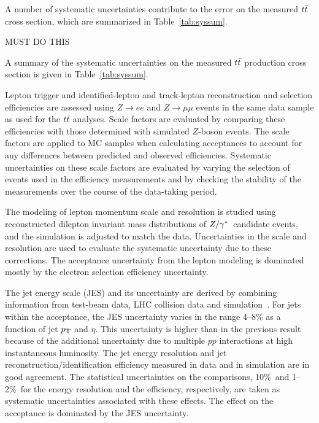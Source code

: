 A number of systematic uncertainties contribute to the error on the measured $t\bar{t}$ cross section, which are summarized in Table~\ref{tab:syssum}.

MUST DO THIS


A summary of the systematic uncertainties on the measured $t\bar{t}$ production cross section is given in Table~\ref{tab:syssum}.

Lepton trigger and identified-lepton and track-lepton
reconstruction and selection efficiencies are assessed using
$Z\rightarrow ee$ and $Z\rightarrow\mu\mu$ events in the same data
sample as used for the $t\bar{t}$ analyses.
Scale factors are evaluated by comparing these efficiencies with those determined with simulated $Z$-boson events. The scale factors are applied to MC samples when calculating
acceptances to account for any differences between predicted and observed efficiencies.  Systematic uncertainties on these scale factors are evaluated by varying the selection of events used in the efficiency measurements and by checking the stability of the measurements over the course of the data-taking period.

The modeling of lepton momentum scale and resolution is studied using
reconstructed dilepton invariant mass distributions of $Z/\gamma^{*}$\ candidate events, and
the simulation is adjusted to match the data.  Uncertainties in the scale and resolution are used to
evaluate the systematic uncertainty due to these corrections.
The acceptance uncertainty from the lepton modeling is dominated
mostly by the electron selection efficiency uncertainty.

The jet energy scale (JES) and its uncertainty are derived by
combining information from test-beam data, LHC collision data and
simulation~\cite{Aad:2011he}.
For jets within the acceptance, the JES uncertainty varies
in the range 4--8\%
as a function of jet $p_{\mathrm{T}}$ and $\eta$. This uncertainty is higher than in the previous result~\cite{ATL-CONF-2011-034} because of the additional uncertainty due to multiple $pp$ interactions at high instantaneous luminosity. The jet energy
resolution and jet reconstruction/identification efficiency measured in data and in
simulation are in good agreement. The statistical uncertainties on the
comparisons,  10\%\ and 1--2\%\ for the energy resolution and the efficiency,
respectively, are taken as systematic uncertainties associated with these effects.
The effect on the acceptance is dominated by the JES uncertainty.


